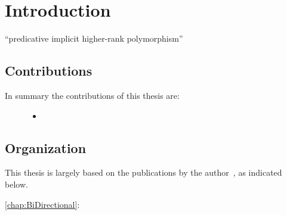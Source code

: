 \chapter{Introduction}

``predicative implicit higher-rank polymorphism''

\section{Contributions}

In summary the contributions of this thesis are:


\begin{description}
\item[]
  \begin{itemize}
  \item ~
  \end{itemize}
\end{description}


\section{Organization}

This thesis is largely based on the
publications by the author~\citep{},
as indicated below.
\begin{description}
\item[\cref{chap:BiDirectional}:]~
\end{description}


\noindent\makebox[\linewidth]{\rule{0.7\textwidth}{0.4pt}}

\vspace{1.5\baselineskip}



